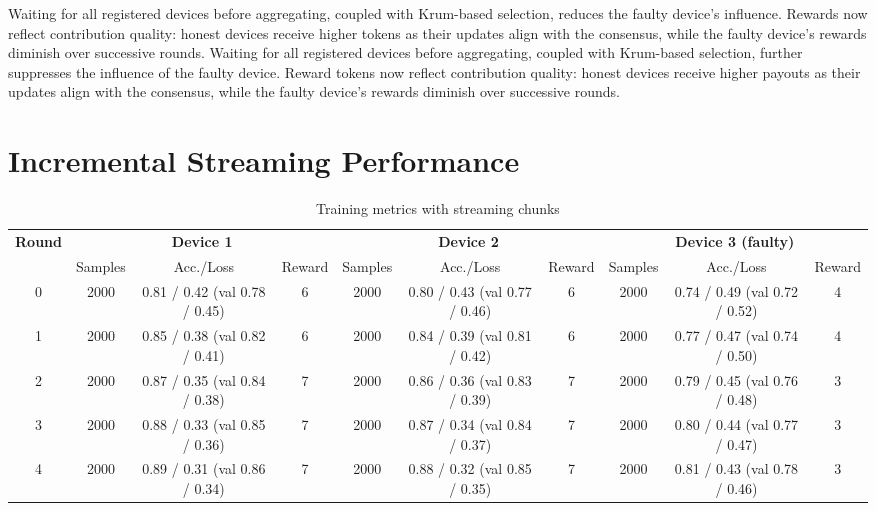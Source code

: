 Waiting for all registered devices before aggregating, coupled with Krum-based selection, reduces the faulty device’s influence. Rewards now reflect contribution quality: honest devices receive higher tokens as their updates align with the consensus, while the faulty device’s rewards diminish over successive rounds.
Waiting for all registered devices before aggregating, coupled with Krum-based selection, further suppresses the influence of the faulty device. Reward tokens now reflect contribution quality: honest devices receive higher payouts as their updates align with the consensus, while the faulty device’s rewards diminish over successive rounds.

\section{Incremental Streaming Performance}

\begin{table}[h!]
    \centering
    \caption{Training metrics with streaming chunks}
    \label{tab:streaming_chunks}
    \begin{tabular}{c|ccc|ccc|ccc}
        \toprule
        \multirow{2}{*}{\textbf{Round}} & \multicolumn{3}{c|}{\textbf{Device 1}} & \multicolumn{3}{c|}{\textbf{Device 2}} & \multicolumn{3}{c}{\textbf{Device 3 (faulty)}} \\
        & Samples & Acc./Loss & Reward & Samples & Acc./Loss & Reward & Samples & Acc./Loss & Reward \\
        \midrule
        0 & 2000 & 0.81 / 0.42 (val 0.78 / 0.45) & 6 & 2000 & 0.80 / 0.43 (val 0.77 / 0.46) & 6 & 2000 & 0.74 / 0.49 (val 0.72 / 0.52) & 4 \\
        1 & 2000 & 0.85 / 0.38 (val 0.82 / 0.41) & 6 & 2000 & 0.84 / 0.39 (val 0.81 / 0.42) & 6 & 2000 & 0.77 / 0.47 (val 0.74 / 0.50) & 4 \\
        2 & 2000 & 0.87 / 0.35 (val 0.84 / 0.38) & 7 & 2000 & 0.86 / 0.36 (val 0.83 / 0.39) & 7 & 2000 & 0.79 / 0.45 (val 0.76 / 0.48) & 3 \\
        3 & 2000 & 0.88 / 0.33 (val 0.85 / 0.36) & 7 & 2000 & 0.87 / 0.34 (val 0.84 / 0.37) & 7 & 2000 & 0.80 / 0.44 (val 0.77 / 0.47) & 3 \\
        4 & 2000 & 0.89 / 0.31 (val 0.86 / 0.34) & 7 & 2000 & 0.88 / 0.32 (val 0.85 / 0.35) & 7 & 2000 & 0.81 / 0.43 (val 0.78 / 0.46) & 3 \\
        \bottomrule
    \end{tabular}
\end{table}

